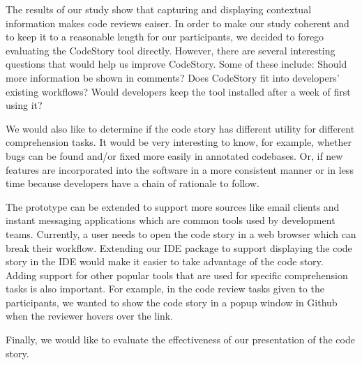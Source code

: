 \documentclass[../manifest.tex]{subfiles}
\begin{document}
The results of our study show that capturing and displaying contextual information makes code reviews eaiser. In order to make our study coherent and to keep it to a reasonable length for our participants, we decided to forego evaluating the  CodeStory tool directly. However, there are several interesting questions that would help us improve CodeStory. Some of these include: Should more information be shown in comments? Does CodeStory fit into developers' existing workflows? Would developers keep the tool installed after a week of first using it?

We would also like to determine if the code story has different utility for different comprehension tasks. It would be very interesting to know, for example, whether bugs can be found and/or fixed more easily in annotated codebases. Or, if new features are incorporated into the software in a more consistent manner or in less time because developers have a chain of rationale to follow.

The prototype can be extended to support more sources like email clients and instant messaging applications which are common tools used by development teams. Currently, a user needs to open the code story in a web browser which can break their workflow. Extending our IDE package to support displaying the code story in the IDE would make it easier to take advantage of the code story. Adding support for other popular tools that are used for specific comprehension tasks is also important. For example, in the code review tasks given to the participants, we wanted to show the code story in a popup window in Github when the reviewer hovers over the link.

Finally, we would like to evaluate the effectiveness of our presentation of the code story.
\end{document}
